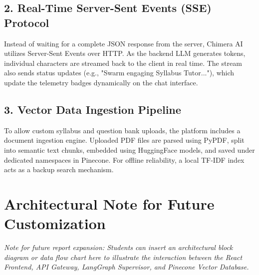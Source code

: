\subsection{2. Real-Time Server-Sent Events (SSE) Protocol}
Instead of waiting for a complete JSON response from the server, Chimera AI utilizes Server-Sent Events over HTTP. As the backend LLM generates tokens, individual characters are streamed back to the client in real time. The stream also sends status updates (e.g., "Swarm engaging Syllabus Tutor..."), which update the telemetry badges dynamically on the chat interface.

\subsection{3. Vector Data Ingestion Pipeline}
To allow custom syllabus and question bank uploads, the platform includes a document ingestion engine. Uploaded PDF files are parsed using PyPDF, split into semantic text chunks, embedded using HuggingFace models, and saved under dedicated namespaces in Pinecone. For offline reliability, a local TF-IDF index acts as a backup search mechanism.

\section{Architectural Note for Future Customization}
\textit{Note for future report expansion: Students can insert an architectural block diagram or data flow chart here to illustrate the interaction between the React Frontend, API Gateway, LangGraph Supervisor, and Pinecone Vector Database.}
